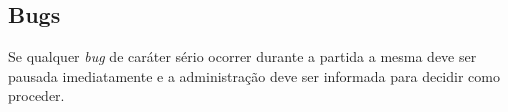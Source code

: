 \subsection{Bugs}

Se qualquer \textit{bug} de caráter sério ocorrer durante a partida a mesma deve ser pausada imediatamente e a administração deve ser informada para decidir como proceder.